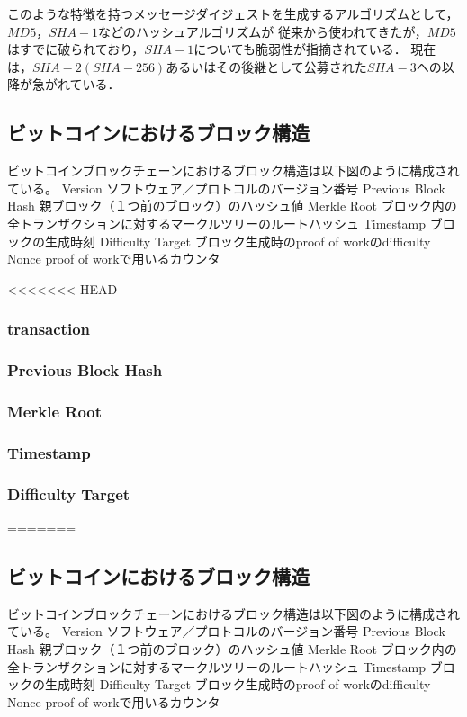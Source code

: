 \documentclass[a4paper,12pt]{jsarticle}
\begin{document}
このような特徴を持つメッセージダイジェストを生成するアルゴリズムとして，$MD5$，$SHA-1$などのハッシュアルゴリズムが
従来から使われてきたが，$MD5$はすでに破られており，$SHA-1$についても脆弱性が指摘されている．
現在は，$SHA-2(SHA-256)$あるいはその後継として公募された$SHA-3$への以降が急がれている．


\subsection{ビットコインにおけるブロック構造}
ビットコインブロックチェーンにおけるブロック構造は以下図のように構成されている。
	Version	ソフトウェア／プロトコルのバージョン番号
	Previous Block Hash	親ブロック（１つ前のブロック）のハッシュ値
	Merkle Root	ブロック内の全トランザクションに対するマークルツリーのルートハッシュ
	Timestamp	ブロックの生成時刻
	Difficulty Target	ブロック生成時のproof of workのdifficulty
	Nonce	proof of workで用いるカウンタ


<<<<<<< HEAD
            \subsubsection{transaction}

            \subsubsection{Previous Block Hash}
            \subsubsection{Merkle Root}
            \subsubsection{Timestamp}
            \subsubsection{Difficulty Target}

=======

\subsection{ビットコインにおけるブロック構造}
ビットコインブロックチェーンにおけるブロック構造は以下図のように構成されている。
	Version	ソフトウェア／プロトコルのバージョン番号
	Previous Block Hash	親ブロック（１つ前のブロック）のハッシュ値
	Merkle Root	ブロック内の全トランザクションに対するマークルツリーのルートハッシュ
	Timestamp	ブロックの生成時刻
	Difficulty Target	ブロック生成時のproof of workのdifficulty
	Nonce	proof of workで用いるカウンタ
\end{document}
